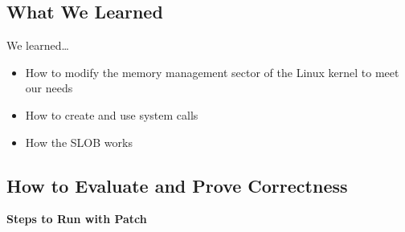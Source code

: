 \documentclass[draftclsnofoot, onecolumn, 10pt, compsoc]{IEEEtran}
\begin{document}
		\subsection{What We Learned}
			We learned\dots 
			\begin{itemize}
				\item How to modify the memory management sector of the Linux kernel to meet our needs 
				\item How to create and use system calls
				\item How the SLOB works
			\end{itemize}
		
		\subsection{How to Evaluate and Prove Correctness}
			\textbf{Steps to Run with Patch}
\end{document}
